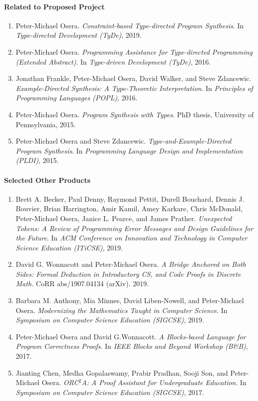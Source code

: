 \documentclass[11pt]{article}
\begin{document}
\paragraph{Related to Proposed Project}
\begin{enumerate}
  \item Peter-Michael Osera.
    \emph{Constraint-based Type-directed Program Synthesis}.
    In \emph{Type-directed Development (TyDe)}, 2019.
  \item Peter-Michael Osera.
    \emph{Programming Assistance for Type-directed Programming (Extended Abstract)}.
    In \emph{Type-driven Development (TyDe)}, 2016.
  \item Jonathan Frankle, Peter-Michael Osera, David Walker, and Steve Zdancewic.
    \emph{Example-Directed Synthesis: A Type-Theoretic Interpretation}.
    In \emph{Principles of Programming Languages (POPL)}, 2016.
  \item Peter-Michael Osera.
    \emph{Program Synthesis with Types}.
    PhD thesis, University of Pennsylvania, 2015.
  \item Peter-Michael Osera and Steve Zdancewic.
    \emph{Type-and-Example-Directed Program Synthesis}.
    In \emph{Programming Language Design and Implementation (PLDI)}, 2015.
\end{enumerate}

\paragraph{Selected Other Products}
\begin{enumerate}
  \item
    Brett A. Becker, Paul Denny, Raymond Pettit, Durell Bouchard, Dennis J. Bouvier, Brian Harrington, Amir Kamil, Amey Karkare, Chris McDonald, Peter-Michael Osera, Janice L. Pearce, and James Prather.
    \emph{Unexpected Tokens: A Review of Programming Error Messages and Design Guidelines for the Future}.
    In \emph{ACM Conference on Innovation and Technology in Computer Science Education (ITiCSE)}, 2019.
  \item
    David G. Wonnacott and Peter-Michael Osera.
    \emph{A Bridge Anchored on Both Sides: Formal Deduction in Introductory CS, and Code Proofs in Discrete Math.}
    CoRR abs/1907.04134 (arXiv).  2019.
  \item
    Barbara M. Anthony, Mia Minnes, David Liben-Nowell, and Peter-Michael Osera.
    \emph{Modernizing the Mathematics Taught in Computer Science}.
    In \emph{Symposium on Computer Science Education (SIGCSE)}, 2019.
  \item
    Peter-Michael Osera and David G.Wonnacott.
    \emph{A Blocks-based Language for Program Correctness Proofs}.
    In \emph{IEEE Blocks and Beyond Workshop (B\&B)}, 2017.
  \item
    Jianting Chen, Medha Gopalaswamy, Prabir Pradhan, Sooji Son, and Peter-Michael Osera.
    \emph{ORC$^2$A: A Proof Assistant for Undergraduate Education}.
    In \emph{Symposium on Computer Science Education (SIGCSE)}, 2017.
\end{enumerate}
\end{document}
